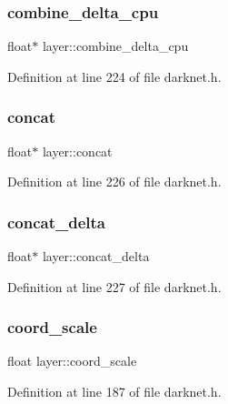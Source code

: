 \subsubsection{\texorpdfstring{combine\_delta\_cpu}{combine\_delta\_cpu}}
{\footnotesize\ttfamily float$\ast$ layer\+::combine\+\_\+delta\+\_\+cpu}



Definition at line 224 of file darknet.\+h.

\mbox{\label{structlayer_aa2edc68cb4713d7b34f52b27b2c0a35b}} 
\subsubsection{\texorpdfstring{concat}{concat}}
{\footnotesize\ttfamily float$\ast$ layer\+::concat}



Definition at line 226 of file darknet.\+h.

\mbox{\label{structlayer_a1de4fac7dfc2c7c9ab387bc322246258}} 
\subsubsection{\texorpdfstring{concat\_delta}{concat\_delta}}
{\footnotesize\ttfamily float$\ast$ layer\+::concat\+\_\+delta}



Definition at line 227 of file darknet.\+h.

\mbox{\label{structlayer_a4cb681c94203182c328d7818bcb39de8}} 
\subsubsection{\texorpdfstring{coord\_scale}{coord\_scale}}
{\footnotesize\ttfamily float layer\+::coord\+\_\+scale}



Definition at line 187 of file darknet.\+h.

\mbox{\label{structlayer_a6b8636464bcea5dea2c2235ee133af29}} 
